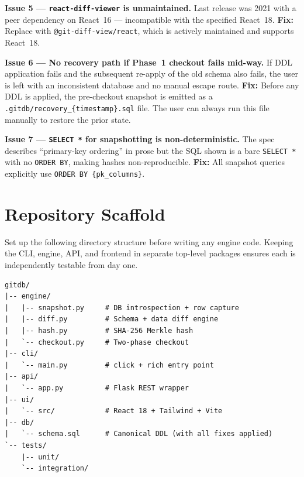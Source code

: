 \documentclass[12pt, a4paper]{article}
\begin{document}
\begin{tcolorbox}[warningbox]
\textbf{Issue 5 --- \texttt{react-diff-viewer} is unmaintained.}
Last release was 2021 with a peer dependency on React~16 --- incompatible with
the specified React~18.
\textbf{Fix:} Replace with \texttt{@git-diff-view/react}, which is actively
maintained and supports React~18.
\end{tcolorbox}

\begin{tcolorbox}[warningbox]
\textbf{Issue 6 --- No recovery path if Phase~1 checkout fails mid-way.}
If DDL application fails and the subsequent re-apply of the old schema also
fails, the user is left with an inconsistent database and no manual escape route.
\textbf{Fix:} Before any DDL is applied, the pre-checkout snapshot is emitted as
a \texttt{.gitdb/recovery\_\{timestamp\}.sql} file. The user can always run
this file manually to restore the prior state.
\end{tcolorbox}

\begin{tcolorbox}[warningbox]
\textbf{Issue 7 --- \texttt{SELECT *} for snapshotting is non-deterministic.}
The spec describes ``primary-key ordering'' in prose but the SQL shown is a bare
\texttt{SELECT *} with no \texttt{ORDER BY}, making hashes non-reproducible.
\textbf{Fix:} All snapshot queries explicitly use
\texttt{ORDER BY \{pk\_columns\}}.
\end{tcolorbox}

\section{Repository Scaffold}

Set up the following directory structure before writing any engine code.
Keeping the CLI, engine, API, and frontend in separate top-level packages
ensures each is independently testable from day one.

\begin{tcolorbox}[commandbox, title=Project Directory Layout]
\begin{lstlisting}
gitdb/
|-- engine/
|   |-- snapshot.py     # DB introspection + row capture
|   |-- diff.py         # Schema + data diff engine
|   |-- hash.py         # SHA-256 Merkle hash
|   `-- checkout.py     # Two-phase checkout
|-- cli/
|   `-- main.py         # click + rich entry point
|-- api/
|   `-- app.py          # Flask REST wrapper
|-- ui/
|   `-- src/            # React 18 + Tailwind + Vite
|-- db/
|   `-- schema.sql      # Canonical DDL (with all fixes applied)
`-- tests/
    |-- unit/
    `-- integration/
\end{lstlisting}
\end{tcolorbox}
\end{document}
